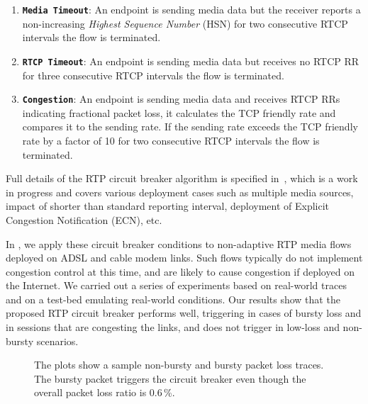 \begin{enumerate}
\setlength{\itemsep}{0pt}

\item \textbf{\texttt{Media Timeout}}: An endpoint is sending media data but
the receiver reports a non-increasing \emph{Highest Sequence Number} (HSN) for
two consecutive RTCP intervals the flow is terminated.

\item \textbf{\texttt{RTCP Timeout}}: An endpoint is sending media data but
receives no RTCP RR for three consecutive RTCP intervals the flow is
terminated.

\item \textbf{\texttt{Congestion}}: An endpoint is sending media data and
receives RTCP RRs indicating fractional packet loss, it calculates the TCP
friendly rate and compares it to the sending rate. If the sending rate exceeds
the TCP friendly rate  by a factor of 10 for two consecutive RTCP intervals
the flow is terminated.

\end{enumerate}

Full details of the RTP circuit breaker algorithm is specified
in~\cite{draft.rtp.cb}, which is a work in progress and covers various
deployment cases such as multiple media sources, impact of shorter than
standard reporting interval, deployment of Explicit Congestion Notification
(ECN), etc.

In , we apply these circuit breaker conditions to non-adaptive
RTP media flows deployed on ADSL and cable modem links.  Such flows typically
do not implement congestion control at this time, and are likely to cause
congestion if deployed on the Internet. We carried out a series of experiments
based on real-world traces and on a test-bed emulating real-world conditions.
Our results show that the proposed RTP circuit breaker performs well,
triggering in cases of bursty loss and in sessions that are congesting the
links, and does not trigger in low-loss and non-bursty scenarios.

\begin{figure}
  \centerline{
  }
  \caption{The plots show a sample non-bursty and bursty packet loss traces.
  The bursty packet triggers the circuit breaker even though the overall
  packet loss ratio is 0.6\,\%.}
  \label{fig:4:bursty}
\end{figure}

